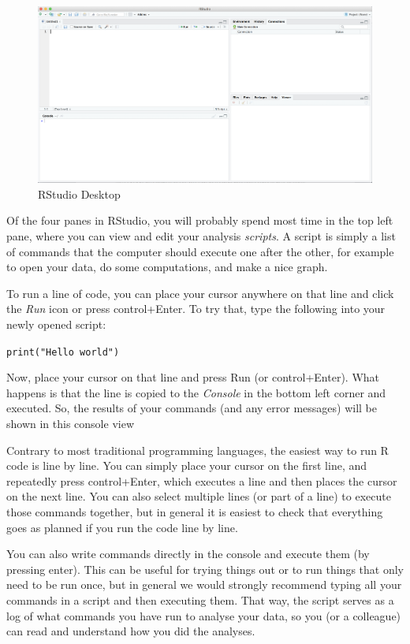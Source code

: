 \begin{figure}
\centering
\includegraphics[width=0.9\linewidth]{figures/ch3_r_studio}
\caption{RStudio Desktop}
\label{fig:rstudio}
\end{figure}

Of the four panes in RStudio,
you will probably spend most time in the top left pane, where you can view and edit your analysis \emph{scripts}.
A script is simply a list of commands that the computer should execute one after the other,
for example to open your data, do some computations, and make a nice graph. 

To run a line of code, you can place your cursor anywhere on that line and click the \emph{Run} icon or
press control+Enter.
To try that, type the following into your newly opened script:

\verb|print("Hello world")|

Now, place your cursor on that line and press Run (or control+Enter).
What happens is that the line is copied to the \emph{Console} in the bottom left corner
and executed.
So, the results of your commands (and any error messages) will be shown in this console view

Contrary to most traditional programming languages,
the easiest way to run R code is line by line.
You can simply place your cursor on the first line,
and repeatedly press control+Enter, which executes a line and then places the cursor on the next line.
You can also select multiple lines (or part of a line) to execute those commands together,
but in general it is easiest to check that everything goes as planned if you run the code line by line.

You can also write commands directly in the console and execute them (by pressing enter).
This can be useful for trying things out or to run things that only need to be run once,
but in general we would strongly recommend typing all your commands in a script and then executing them.
That way, the script serves as a log of what commands you have run to analyse your data,
so you (or a colleague) can read and understand how you did the analyses. 

